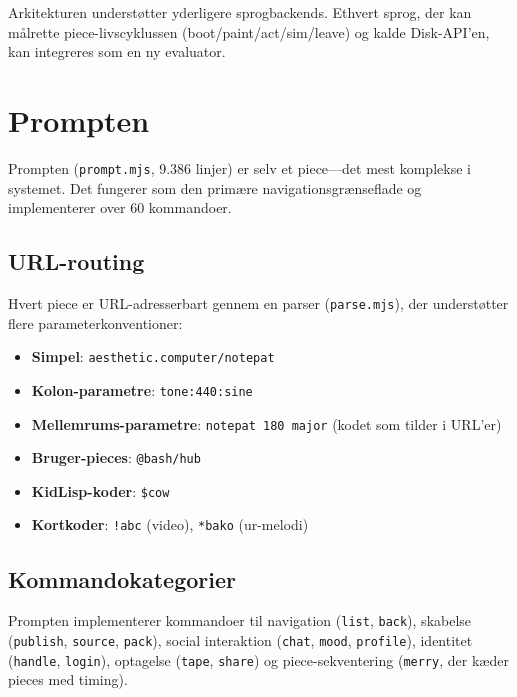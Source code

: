 \documentclass[10pt,letterpaper,twocolumn]{article}
\begin{document}
Arkitekturen understøtter yderligere sprogbackends. Ethvert sprog, der kan målrette piece-livscyklussen (boot/paint/act/sim/leave) og kalde Disk-API'en, kan integreres som en ny evaluator.


\section{Prompten}
\label{sec:prompt}

Prompten (\texttt{prompt.mjs}, 9.386 linjer) er selv et piece---det mest komplekse i systemet. Det fungerer som den primære navigationsgrænseflade og implementerer over 60 kommandoer.

\subsection{URL-routing}

Hvert piece er URL-adresserbart gennem en parser (\texttt{parse.mjs}), der understøtter flere parameterkonventioner:

\begin{itemize}
  \item \textbf{Simpel}: \texttt{aesthetic.computer/notepat}
  \item \textbf{Kolon-parametre}: \texttt{tone:440:sine}
  \item \textbf{Mellemrums-parametre}: \texttt{notepat 180 major} (kodet som tilder i URL'er)
  \item \textbf{Bruger-pieces}: \texttt{@bash/hub}
  \item \textbf{KidLisp-koder}: \texttt{\$cow}
  \item \textbf{Kortkoder}: \texttt{!abc} (video), \texttt{*bako} (ur-melodi)
\end{itemize}

\subsection{Kommandokategorier}

Prompten implementerer kommandoer til navigation (\texttt{list}, \texttt{back}), skabelse (\texttt{publish}, \texttt{source}, \texttt{pack}), social interaktion (\texttt{chat}, \texttt{mood}, \texttt{profile}), identitet (\texttt{handle}, \texttt{login}), optagelse (\texttt{tape}, \texttt{share}) og piece-sekventering (\texttt{merry}, der kæder pieces med timing).

\end{document}
